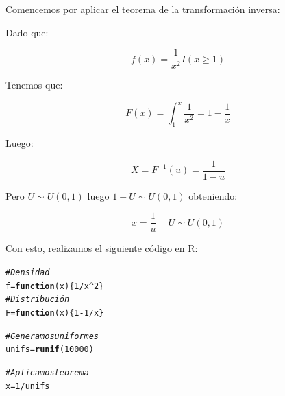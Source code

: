 \documentclass[12 pt]{article}\usepackage[]{graphicx}\usepackage[]{color}
\makeatletter
\newcommand{\hlnum}[1]{\textcolor[rgb]{0.686,0.059,0.569}{#1}}%
\newcommand{\hlcom}[1]{\textcolor[rgb]{0.678,0.584,0.686}{\textit{#1}}}%
\newcommand{\hlopt}[1]{\textcolor[rgb]{0,0,0}{#1}}%
\newcommand{\hlstd}[1]{\textcolor[rgb]{0.345,0.345,0.345}{#1}}%
\newcommand{\hlkwa}[1]{\textcolor[rgb]{0.161,0.373,0.58}{\textbf{#1}}}%
\newcommand{\hlkwb}[1]{\textcolor[rgb]{0.69,0.353,0.396}{#1}}%
\newcommand{\hlkwc}[1]{\textcolor[rgb]{0.333,0.667,0.333}{#1}}%
\newcommand{\hlkwd}[1]{\textcolor[rgb]{0.737,0.353,0.396}{\textbf{#1}}}%
\newenvironment{kframe}{%
 \def\at@end@of@kframe{}%
 \ifinner\ifhmode%
  \def\at@end@of@kframe{\end{minipage}}%
  \begin{minipage}{\columnwidth}%
 \fi\fi%
 \def\FrameCommand##1{\hskip\@totalleftmargin \hskip-\fboxsep
 \colorbox{shadecolor}{##1}\hskip-\fboxsep
     \hskip-\linewidth \hskip-\@totalleftmargin \hskip\columnwidth}%
 \MakeFramed {\advance\hsize-\width
   \@totalleftmargin\z@ \linewidth\hsize
   \@setminipage}}%
 {\par\unskip\endMakeFramed%
 \at@end@of@kframe}
\newenvironment{knitrout}{}{} %
\makeatother
\begin{document}
\begin{enumerate}
Comencemos por aplicar el teorema de la transformación inversa:

Dado que:

\[f(x) = \frac{1}{x^2} I(x \geq 1)\]

Tenemos que:

\[F(x) = \int_1^x \frac{1}{x^2} = 1 - \frac{1}{x} \]

Luego:

\[X = F^{-1}(u) = \frac{1}{1-u}\]

Pero $U \sim U(0,1)$ luego $1-U \sim U(0,1)$ obteniendo:

\[x = \frac{1}{u}\ \quad U \sim U(0,1)\]

Con esto, realizamos el siguiente código en R:

\begin{knitrout}
\color{fgcolor}\begin{kframe}
\begin{alltt}
    \hlcom{#Densidad}
    \hlstd{f} \hlkwb{=} \hlkwa{function}\hlstd{(}\hlkwc{x}\hlstd{)\{}\hlnum{1}\hlopt{/}\hlstd{x}\hlopt{^}\hlnum{2}\hlstd{\}}
    \hlcom{#Distribución}
    \hlstd{F} \hlkwb{=} \hlkwa{function}\hlstd{(}\hlkwc{x}\hlstd{)\{}\hlnum{1} \hlopt{-} \hlnum{1}\hlopt{/}\hlstd{x\}}

    \hlcom{#Generamos uniformes}
    \hlstd{unifs} \hlkwb{=} \hlkwd{runif}\hlstd{(}\hlnum{10000}\hlstd{)}

    \hlcom{#Aplicamos teorema}
    \hlstd{x} \hlkwb{=} \hlnum{1}\hlopt{/}\hlstd{unifs}


\end{alltt}
\end{kframe}
\end{knitrout}
\end{enumerate}
\end{document}
